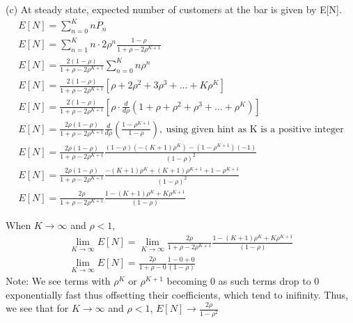 (c) At steady state, expected number of customers at the bar is given by E[N].
\begin{gather*}
E[N] = \sum_{n=0}^{K}nP_n\\
E[N] = \sum_{n=1}^{K}n\cdot2\rho^n\frac{1-\rho}{1+\rho - 2\rho^{K+1}}\\
E[N] = \frac{2(1-\rho)}{1+\rho - 2\rho^{K+1}}\sum_{n=0}^{K}n\rho^n\\
E[N] = \frac{2(1-\rho)}{1+\rho - 2\rho^{K+1}}[\rho + 2\rho^2 + 3\rho^3 + ... + K\rho^K]\\
E[N] = \frac{2(1-\rho)}{1+\rho - 2\rho^{K+1}}[\rho \cdot \frac{d}{d\rho} (1 + \rho + \rho^2 + \rho^3 + ... + \rho^K)]\\
E[N] = \frac{2\rho(1-\rho)}{1+\rho - 2\rho^{K+1}}\frac{d}{d\rho} (\frac{1 - \rho^{K+1}}{1 - \rho}), \ \text{using given hint as K is a positive integer} \\
E[N] = \frac{2\rho(1-\rho)}{1+\rho - 2\rho^{K+1}}\frac{(1-\rho)(-(K+1)\rho^K) - (1 - \rho^{K+1})(-1)}{(1-\rho)^2}\\
E[N] = \frac{2\rho(1-\rho)}{1+\rho - 2\rho^{K+1}}\frac{-(K+1)\rho^K + (K+1)\rho^{K+1}+1 - \rho^{K+1}}{(1-\rho)^2}\\
E[N] = \frac{2\rho}{1+\rho - 2\rho^{K+1}}\frac{1 - (K+1)\rho^K + K\rho^{K+1}}{(1-\rho)}
\end{gather*}

When $K\to\infty$ and $\rho < 1$,
\begin{gather*}
\lim_{K\to\infty}E[N] = \lim_{K\to\infty} \frac{2\rho}{1+\rho - 2\rho^{K+1}}\frac{1 - (K+1)\rho^K + K\rho^{K+1}}{(1-\rho)}\\
\lim_{K\to\infty}E[N] = \frac{2\rho}{1+\rho - 0}\frac{1 - 0 + 0}{(1-\rho)}
\end{gather*}
Note: We see terms with $\rho^{K}$ or $\rho^{K+1}$ becoming 0 as such terms drop to 0 exponentially fast thus offsetting their coefficients, which tend to inifinity. Thus, we see that for $K\to\infty$ and $\rho<1$, $E[N]\to\frac{2\rho}{1-\rho^2}$


